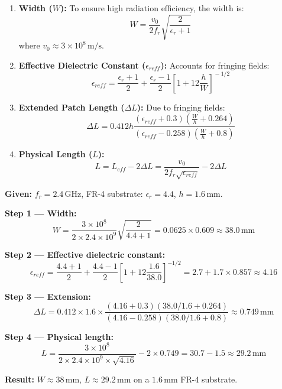 \documentclass[12pt,a4paper]{article}
\begin{document}
\begin{tcolorbox}[formulabox, title={\textbf{Rectangular Patch Design Calculations}}]
\begin{enumerate}[leftmargin=*, label=\textbf{\arabic*.}, itemsep=3pt, topsep=1pt]
  \item \textbf{Width ($W$):} To ensure high radiation efficiency, the width is:
  \[
  W = \frac{v_0}{2 f_r} \sqrt{\frac{2}{\epsilon_r + 1}}
  \]
  where $v_0 \approx 3 \times 10^8\,\text{m/s}$.
  \item \textbf{Effective Dielectric Constant ($\epsilon_{reff}$):} Accounts for fringing fields:
  \[
  \epsilon_{reff} = \frac{\epsilon_r + 1}{2} + \frac{\epsilon_r - 1}{2} \left[ 1 + 12 \frac{h}{W} \right]^{\!-1/2}
  \]
  \item \textbf{Extended Patch Length ($\Delta L$):} Due to fringing fields:
  \[
  \Delta L = 0.412 h \frac{(\epsilon_{reff} + 0.3)\left(\frac{W}{h} + 0.264\right)}{(\epsilon_{reff} - 0.258)\left(\frac{W}{h} + 0.8\right)}
  \]
  \item \textbf{Physical Length ($L$):}
  \[
  L = L_{eff} - 2\Delta L = \frac{v_0}{2 f_r \sqrt{\epsilon_{reff}}} - 2\Delta L
  \]
\end{enumerate}
\end{tcolorbox}

\begin{tcolorbox}[examplebox, title={\textbf{Worked Example: Rectangular Patch at 2.4 GHz}}]
\textbf{Given:} $f_r = 2.4\,\text{GHz}$, FR-4 substrate: $\epsilon_r = 4.4$, $h = 1.6\,\text{mm}$.

\textbf{Step 1 — Width:}
\[
W = \frac{3 \times 10^8}{2 \times 2.4 \times 10^9}\sqrt{\frac{2}{4.4+1}} = 0.0625 \times 0.609 \approx 38.0\,\text{mm}
\]

\textbf{Step 2 — Effective dielectric constant:}
\[
\epsilon_{reff} = \frac{4.4+1}{2} + \frac{4.4-1}{2}\left[1 + 12\frac{1.6}{38.0}\right]^{-1/2} = 2.7 + 1.7 \times 0.857 \approx 4.16
\]

\textbf{Step 3 — Extension:}
\[
\Delta L = 0.412 \times 1.6 \times \frac{(4.16+0.3)(38.0/1.6+0.264)}{(4.16-0.258)(38.0/1.6+0.8)} \approx 0.749\,\text{mm}
\]

\textbf{Step 4 — Physical length:}
\[
L = \frac{3\times10^8}{2 \times 2.4\times10^9 \times \sqrt{4.16}} - 2 \times 0.749 = 30.7 - 1.5 \approx 29.2\,\text{mm}
\]

\textbf{Result:} $W \approx 38\,\text{mm}$, $L \approx 29.2\,\text{mm}$ on a $1.6\,\text{mm}$ FR-4 substrate.
\end{tcolorbox}
\end{document}
